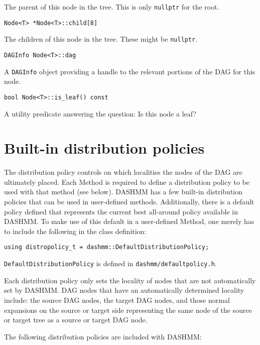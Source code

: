 The parent of this node in the tree. This is only \texttt{nullptr} for
the root.

\begin{lstlisting}
Node<T> *Node<T>::child[8]
\end{lstlisting}


The children of this node in the tree. These might be \texttt{nullptr}.

\begin{lstlisting}
DAGInfo Node<T>::dag
\end{lstlisting}


A \texttt{DAGInfo} object providing a handle to the relevant portions of the
DAG for this node.

\begin{lstlisting}
bool Node<T>::is_leaf() const
\end{lstlisting}


A utility predicate answering the question: Is this node a leaf?


\section{Built-in distribution policies}

The distribution policy controls on which localities the nodes of the DAG
are ultimately placed. Each Method is required to define a distribution policy
to be used with that method (see below). DASHMM has a few built-in distribution
policies that can be used in user-defined methods. Additionally, there is a
default policy defined that represents the current best all-around policy
available in DASHMM. To make use of this default in a user-defined Method,
one merely has to include the following in the class definition:

\begin{lstlisting}
using distropolicy_t = dashmm::DefaultDistributionPolicy;
\end{lstlisting}

\noindent \texttt{DefaultDistributionPolicy} is defined in
\texttt{dashmm/defaultpolicy.h}.

Each distribution policy only sets the locality of nodes that are not
automatically set by DASHMM. DAG nodes that have an automatically determined
locality include: the source DAG nodes, the target DAG nodes, and those
normal expansions on the source or target side representing the same node of
the source or target tree as a source or target DAG node.

The following distribution policies are included with DASHMM:

